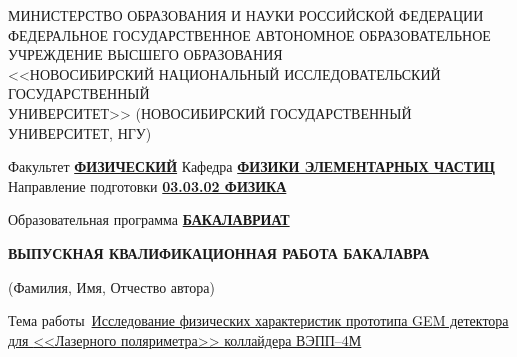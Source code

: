\documentclass[a4paper,11pt]{extreport}
\begin{document}
	\thispagestyle{empty}
	
	\begin{center}
		МИНИСТЕРСТВО ОБРАЗОВАНИЯ И НАУКИ РОССИЙСКОЙ ФЕДЕРАЦИИ\\
		\vspace{0.3\baselineskip}
		 ФЕДЕРАЛЬНОЕ ГОСУДАРСТВЕННОЕ АВТОНОМНОЕ ОБРАЗОВАТЕЛЬНОЕ \\ 
			УЧРЕЖДЕНИЕ ВЫСШЕГО ОБРАЗОВАНИЯ \\
		\vspace{0.3\baselineskip}
		 <<НОВОСИБИРСКИЙ НАЦИОНАЛЬНЫЙ ИССЛЕДОВАТЕЛЬСКИЙ ГОСУДАРСТВЕННЫЙ \\
			УНИВЕРСИТЕТ>> (НОВОСИБИРСКИЙ ГОСУДАРСТВЕННЫЙ УНИВЕРСИТЕТ, НГУ)
	\end{center}
	\vspace{41pt}
	\noindent
	 Факультет \underline{\textbf{ФИЗИЧЕСКИЙ}}
	\vspace{11pt}
	\noindent
 	\newline Кафедра \underline{\textbf{ФИЗИКИ ЭЛЕМЕНТАРНЫХ ЧАСТИЦ}\hspace{8cm}}
	\vspace{21pt}
	\noindent
	\newline Направление подготовки \underline{\textbf{03.03.02 ФИЗИКА}}
	\vspace{11pt}
	
	\noindent
	Образовательная программа \underline{\textbf{БАКАЛАВРИАТ}}
	
	\vspace{21pt}
	\begin{center}\bfseries
		{ВЫПУСКНАЯ КВАЛИФИКАЦИОННАЯ РАБОТА БАКАЛАВРА} \\
	\end{center}
\vspace{0.3\baselineskip}

\noindent
{}
\noalign \hline
\vspace*{7pt}
\tiny{(Фамилия, Имя, Отчество автора)}

\vspace{\baselineskip}
\noindent \normalsize
\flushleft Тема работы~\underline{Исследование физических характеристик прототипа GEM детектора для \hspace{2.3cm}}\newline
\underline{<<Лазерного поляриметра>> коллайдера ВЭПП--4М\hspace{8.4cm}}
\end{document}
